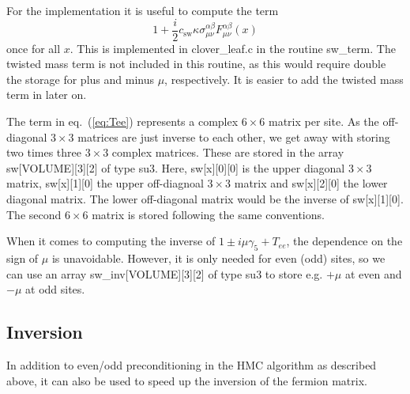 For the implementation it is useful to compute the term
\begin{equation}
  \label{eq:Tee}
  1 + \frac{i}{2} c_\mathrm{sw}
  \kappa\sigma_{\mu\nu}^{\alpha\beta}F_{\mu\nu}^{\alpha\beta}(x)
\end{equation}  
once for all $x$. This is implemented in {\ttfamily clover\_leaf.c} in
the routine {\ttfamily sw\_term}. The twisted mass term is not
included in this routine, as this would require double the storage for
plus and minus $\mu$, respectively. It is easier to add the twisted
mass term in later on. 

The term in eq.~(\ref{eq:Tee}) represents a complex $6\times6$ matrix
per site. As the off-diagonal $3\times3$ matrices are just inverse to
each other, we get away with storing two times three $3\times3$
complex matrices. These are stored in the array {\ttfamily
  sw[VOLUME][3][2]} of type {\ttfamily su3}. Here, {\ttfamily
  sw[x][0][0]} is the upper diagonal $3\times3$ matrix, {\ttfamily
  sw[x][1][0]} the upper off-diagnoal $3\times3$ matrix and {\ttfamily
  sw[x][2][0]} the lower diagonal matrix. The lower off-diagonal
matrix would be the inverse of {\ttfamily sw[x][1][0]}. The second
$6\times6$ matrix is stored following the same conventions.

When it comes to computing the inverse of $1\pm i \mu\gamma_5 +
T_{ee}$, the dependence on the sign of $\mu$ is unavoidable. However,
it is only needed for even (odd) sites, so we can use an array
{\ttfamily sw\_inv[VOLUME][3][2]} of type {\ttfamily su3} to store
e.g. $+\mu$ at even and $-\mu$ at odd sites.

\subsection{Inversion}

In addition to even/odd preconditioning in the HMC algorithm as
described above, it can also be used to speed up the inversion of the
fermion matrix. 

